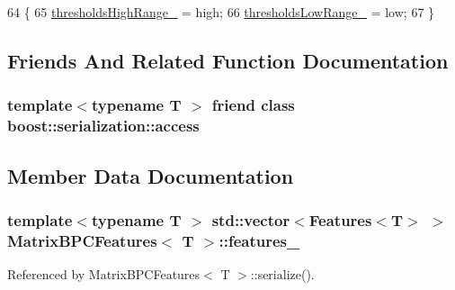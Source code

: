 \begin{DoxyCode}
64                                                              \{
65   \hyperlink{classMatrixBPCFeatures_ae8a6cffe3353dfd370fb0b4e5d2385ca}{thresholdsHighRange\_} = high;
66   \hyperlink{classMatrixBPCFeatures_a3b26efde265078abd546a45ea443bf6d}{thresholdsLowRange\_} = low;
67 \}
\end{DoxyCode}


\subsection{Friends And Related Function Documentation}
\subsubsection[{\texorpdfstring{boost\+::serialization\+::access}{boost::serialization::access}}]{\setlength{\rightskip}{0pt plus 5cm}template$<$typename T $>$ friend class boost\+::serialization\+::access\hspace{0.3cm}{\ttfamily [friend]}}\hypertarget{classMatrixBPCFeatures_ac98d07dd8f7b70e16ccb9a01abf56b9c}{}\label{classMatrixBPCFeatures_ac98d07dd8f7b70e16ccb9a01abf56b9c}


\subsection{Member Data Documentation}
\subsubsection[{\texorpdfstring{features\+\_\+}{features_}}]{\setlength{\rightskip}{0pt plus 5cm}template$<$typename T $>$ std\+::vector$<${\bf Features}$<$T$>$ $>$ {\bf Matrix\+B\+P\+C\+Features}$<$ T $>$\+::features\+\_\+}\hypertarget{classMatrixBPCFeatures_ad6ce34b650ac55b5d857a322cb239132}{}\label{classMatrixBPCFeatures_ad6ce34b650ac55b5d857a322cb239132}


Referenced by Matrix\+B\+P\+C\+Features$<$ T $>$\+::serialize().

